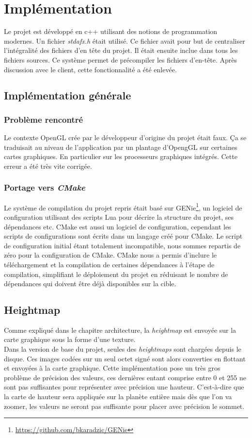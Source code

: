 \chapter{Implémentation}
    Le projet est développé en c++ utilisant des notions de programmation modernes.
    Un fichier \textit{stdafx.h} était utilisé. Ce fichier avait pour but de centraliser l'intégralité des fichiers d'en tête du projet. Il était ensuite inclue dans tous les fichiers sources. Ce système permet de précompiler les fichiers d'en-tête. Après discussion avec le client, cette fonctionnalité a été enlevée.

    \section{Implémentation générale}
    \subsection{Problème rencontré}
    Le contexte OpenGL crée par le développeur d'origine du projet était faux. Ça se traduisait au niveau
    de l'application par un plantage d'OpengGL sur certaines cartes graphiques. En particulier sur les processeurs graphiques intégrés. Cette erreur a été très vite corrigée.
   
    \subsection{Portage vers \textit{CMake}}
    Le système de compilation du projet repris était basé sur GENie\footnote{\url{https://github.com/bkaradzic/GENie}}, un
    logiciel de configuration utilisant des scripts Lua pour décrire la
    structure du projet, ses dépendances etc. CMake est aussi un logiciel de
    configuration, cependant les scripts de configurations sont écrits dans
    un langage créé pour CMake. Le script de configuration initial étant
    totalement incompatible, nous sommes repartis de zéro pour la
    configuration de CMake. CMake nous a permis d'inclure le téléchargement
    et la compilation de certaines dépendances à l'étape de compilation,
    simplifiant le déploiement du projet en réduisant le nombre de
    dépendances qui doivent être déjà disponibles sur la cible.
    
    \section{Heightmap}
    Comme expliqué dans le chapitre architecture, la \emph{heightmap} est envoyée sur la carte graphique sous la forme
    d'une texture.\\
    Dans la version de base du projet, seules des \emph{heightmaps} sont chargées depuis le disque. Ces images codées sur un
    seul octet signé sont alors converties en flottant et envoyées à la carte graphique. Cette implémentation pose un très gros problème de précision des valeurs, ces dernières entant comprise entre 0 et 255 ne sont pas suffisantes pour représenter
    avec précision une hauteur. C'est-à-dire que la carte de hauteur sera appliquée sur la planète entière mais dès que l'on va zoomer, les valeurs ne seront pas suffisante pour placer avec précision le sommet.
    
